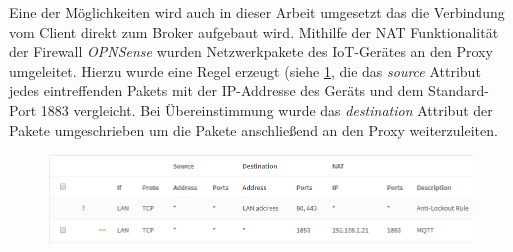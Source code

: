     Eine der Möglichkeiten wird auch in dieser Arbeit umgesetzt das die Verbindung vom Client direkt zum Broker aufgebaut wird.
    Mithilfe der \ac{NAT} Funktionalität der Firewall \emph{OPNSense} wurden Netzwerkpakete des \ac{IoT}-Gerätes an den Proxy umgeleitet. Hierzu wurde eine Regel erzeugt (siehe \ref{fig:firewall_rule}, die das \emph{source} Attribut jedes eintreffenden Pakets mit der IP-Addresse des Geräts und dem Standard-Port 1883 vergleicht. Bei Übereinstimmung wurde das \emph{destination} Attribut der Pakete umgeschrieben um die Pakete anschließend an den Proxy weiterzuleiten.
    \begin{figure}[h]%
        \centering
        \includegraphics[width=14cm]{tex/bilder/5_implementierung/firewall.PNG}
        \label{fig:firewall_rule}
    \end{figure}